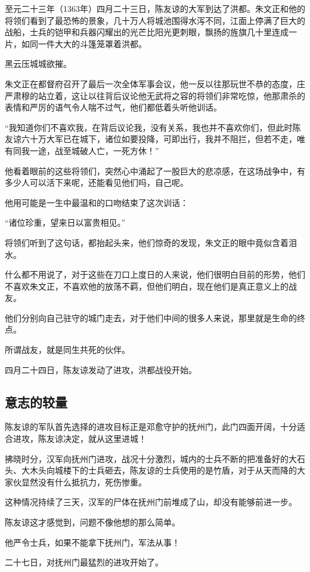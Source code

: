 \begin{multicols}{\theparacolNo}
		至元二十三年（1363年）四月二十三日，陈友谅的大军到达了洪都。朱文正和他的将领们看到了最恐怖的景象，几十万人将城池围得水泻不同，江面上停满了巨大的战船，士兵的铠甲和兵器闪耀出的光芒比阳光更刺眼，飘扬的旌旗几十里连成一片，如同一件大大的斗篷笼罩着洪都。

		黑云压城城欲摧。

		朱文正在都督府召开了最后一次全体军事会议，他一反以往那玩世不恭的态度，庄严肃穆的站立着，这让以往背后议论他无武将之容的将领们非常吃惊，他那肃杀的表情和严厉的语气令人喘不过气，他们都低着头听他训话。

		“我知道你们不喜欢我，在背后议论我，没有关系，我也并不喜欢你们，但此时陈友谅六十万大军已在城下，诸位如要投降，可即出行，我并不阻拦，但若不走，唯有同我一途，战至城破人亡，一死方休！”

		他看着眼前的这些将领们，突然心中涌起了一股巨大的悲凉感，在这场战争中，有多少人可以活下来呢，还能看见他们吗，自己呢。

		他用可能是一生中最温和的口吻结束了这次训话：

		“诸位珍重，望来日以富贵相见。”

		将领们听到了这句话，都抬起头来，他们惊奇的发现，朱文正的眼中竟似含着泪水。

		什么都不用说了，对于这些在刀口上度日的人来说，他们很明白目前的形势，他们不喜欢朱文正，不喜欢他的放荡不羁，但他们明白，现在他们是真正意义上的战友。

		他们分别向自己驻守的城门走去，对于他们中间的很多人来说，那里就是生命的终点。

		所谓战友，就是同生共死的伙伴。

		四月二十四日，陈友谅发动了进攻，洪都战役开始。

		\subsection{意志的较量}
		陈友谅的军队首先选择的进攻目标正是邓愈守护的抚州门，此门四面开阔，十分适合进攻，陈友谅决定，就从这里进城！

		拂晓时分，汉军向抚州门进攻，战况十分激烈，城内的士兵不断的把准备好的大石头、大木头向城楼下的士兵砸去，陈友谅的士兵使用的是竹盾，对于从天而降的大家伙显然没有什么抵抗力，死伤惨重。

		这种情况持续了三天，汉军的尸体在抚州门前堆成了山，却没有能够前进一步。

		陈友谅这才感觉到，问题不像他想的那么简单。

		他严令士兵，如果不能拿下抚州门，军法从事！

		二十七日，对抚州门最猛烈的进攻开始了。


\end{multicols}
